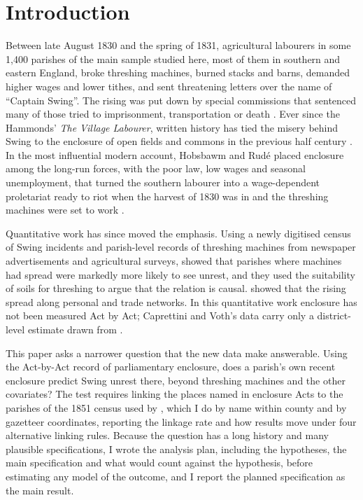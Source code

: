 \documentclass[11pt,a4paper]{article}
\begin{document}
\section{Introduction}
Between late August 1830 and the spring of 1831, agricultural labourers in some 1,400 parishes of the main sample studied here, most of them in southern and eastern England, broke threshing machines, burned stacks and barns, demanded higher wages and lower tithes, and sent threatening letters over the name of ``Captain Swing''. The rising was put down by special commissions that sentenced many of those tried to imprisonment, transportation or death \citep{hobsbawmrude1969}. Ever since the Hammonds' \textit{The Village Labourer}, written history has tied the misery behind Swing to the enclosure of open fields and commons in the previous half century \citep{hammond1911}. In the most influential modern account, Hobsbawm and Rud\'e placed enclosure among the long-run forces, with the poor law, low wages and seasonal unemployment, that turned the southern labourer into a wage-dependent proletariat ready to riot when the harvest of 1830 was in and the threshing machines were set to work \citep{hobsbawmrude1969}.

Quantitative work has since moved the emphasis. Using a newly digitised census of Swing incidents \citep{holland2005} and parish-level records of threshing machines from newspaper advertisements and agricultural surveys, \citet{caprettinivoth2020} showed that parishes where machines had spread were markedly more likely to see unrest, and they used the suitability of soils for threshing to argue that the relation is causal. \citet{aidtleon2022} showed that the rising spread along personal and trade networks. In this quantitative work enclosure has not been measured Act by Act; Caprettini and Voth's data carry only a district-level estimate drawn from \citet{gonner1912}.

This paper asks a narrower question that the new data make answerable. Using the Act-by-Act record of parliamentary enclosure, does a parish's own recent enclosure predict Swing unrest there, beyond threshing machines and the other covariates? The test requires linking the places named in enclosure Acts to the parishes of the 1851 census used by \citet{caprettinivoth2020}, which I do by name within county and by gazetteer coordinates, reporting the linkage rate and how results move under four alternative linking rules. Because the question has a long history and many plausible specifications, I wrote the analysis plan, including the hypotheses, the main specification and what would count against the hypothesis, before estimating any model of the outcome, and I report the planned specification as the main result.
\end{document}
